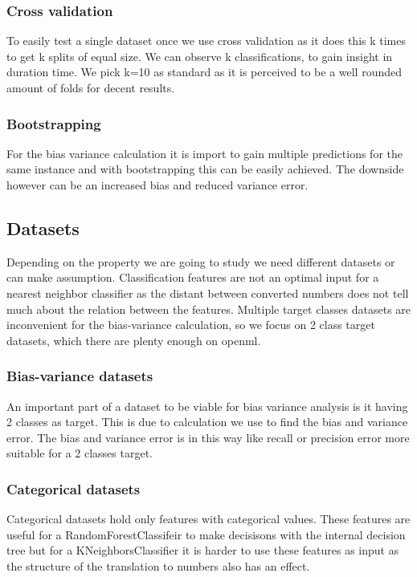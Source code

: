 \documentclass[a4paper,10pt]{article}
\begin{document}
\subsubsection{Cross validation} \label{cross-val}
To easily test a single dataset once we use cross validation as it does this k times to get k splits of equal size. We can observe k classifications, to gain insight in duration time. We pick k=10 as standard as it is perceived to be a well rounded amount of folds for decent results\cite{Cross}.

\subsubsection{Bootstrapping} \label{motivation}
For the bias variance calculation it is import to gain multiple predictions for the same instance and with bootstrapping this can be easily achieved. The downside however can be an increased bias and reduced variance error.  

\subsection{Datasets} \label{description}
Depending on the property we are going to study we need different datasets or can make assumption. Classification features are not an optimal input for a nearest neighbor classifier as the distant between converted numbers does not tell much about the relation between the features. Multiple target classes datasets are inconvenient for the bias-variance calculation, so we focus on 2 class target datasets, which there are plenty enough on openml. 

\subsubsection{Bias-variance datasets}
An important part of a dataset to be viable for bias variance analysis is it having 2 classes as target. This is due to calculation we use to find the bias and variance error. The bias and variance error is in this way like recall or precision error more suitable for a 2 classes target.  %
\subsubsection{Categorical datasets}
Categorical datasets hold only features with categorical values. These features are useful for a RandomForestClassifeir to make decisisons with the internal decision tree but for a KNeighborsClassifier it is harder to use these features as input as the structure of the translation to numbers also has an effect.
\end{document}

